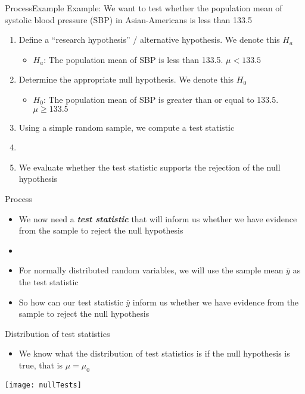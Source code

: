 \documentclass[xcolor=dvipsnames]{beamer}
\begin{document}
\begin{frame}{Process}{Example}
Example: We want to test whether the population mean of systolic blood pressure (SBP) in Asian-Americans is less than 133.5\\
\vspace{10 pt}
	\begin{enumerate}
		\item Define a ``research hypothesis'' / alternative hypothesis. We denote this $H_a$
		\begin{itemize}
			\item $H_a$: The population mean of SBP is less than 133.5. $\mu < 133.5$
		\end{itemize}
		\item Determine the appropriate null hypothesis. We denote this $H_0$
		\begin{itemize}
			\item $H_0$: The population mean of SBP is greater than or equal to 133.5. $\mu \geq 133.5$
		\end{itemize}
		\item Using a simple random sample, we compute a test statistic
		\item[]
		\item We evaluate whether the test statistic supports the rejection of the null hypothesis
	\end{enumerate}
\end{frame}

\begin{frame}{Process}
	\begin{itemize}
		\item We now need a \textbf{\emph{test statistic}} that will inform us whether we have evidence from the sample to reject the null hypothesis
		\item[]
		\item For normally distributed random variables, we will use the sample mean $\bar{y}$ as the test statistic
		\item[] So how can our test statistic $\bar{y}$ inform us whether we have evidence from the sample to reject the null hypothesis
	\end{itemize}
\end{frame}

\begin{frame}{Distribution of test statistics}
	\begin{itemize}
		\item We know what the distribution of test statistics is if the null hypothesis is true, that is $\mu = \mu_0$
	\end{itemize}
\begin{center}
	\texttt{[image: nullTests]}
\end{center}
\end{frame}
\end{document}
